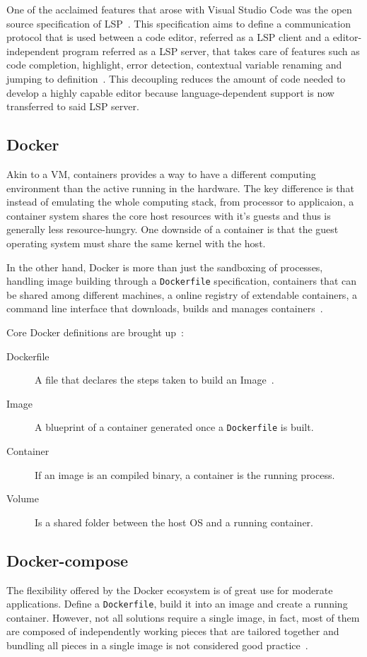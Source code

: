 One of the acclaimed features that arose with Visual Studio Code was the open source specification of \gls{LSP}~\cite{lsplaunch}. This specification aims to define a communication protocol that is used between a code editor, referred as a \gls{LSP} client and a editor-independent program referred as a \gls{LSP} server, that takes care of features such as code completion, highlight, error detection, contextual variable renaming and jumping to definition~\cite{lspspec}. This decoupling reduces the amount of code needed to develop a highly capable editor because language-dependent support is now transferred to said \gls{LSP} server.

\subsection{Docker}
Akin to a \gls{VM}, containers provides a way to have a different computing environment than the active running in the hardware. The key difference is that instead of emulating the whole computing stack, from processor to applicaion, a container system shares the core host resources with it's guests and thus is generally less resource-hungry. One downside of a container is that the guest operating system must share the same kernel with the host.

In the other hand, Docker is more than just the sandboxing of processes, handling image building through a \texttt{Dockerfile} specification, containers that can be shared among different machines, a online registry of extendable containers, a command line interface that downloads, builds and manages containers~\cite{dockerfag}.

Core Docker definitions are brought up~\cite{dockeroverview}:
\begin{description}
\item[Dockerfile] A file that declares the steps taken to build an Image~\cite{dockerfile}.
\item[Image] A blueprint of a container generated once a \texttt{Dockerfile} is built.
\item[Container] If an image is an compiled binary, a container is the running process. 
\item[Volume] Is a shared folder between the host \gls{OS} and a running container.
\end{description}

\subsection{Docker-compose}
The flexibility offered by the Docker ecosystem is of great use for moderate applications. Define a \texttt{Dockerfile}, build it into an image and create a running container. However, not all solutions require a single image, in fact, most of them are composed of independently working pieces that are tailored together and bundling all pieces in a single image is not considered good practice~\cite{dockerfag}.


